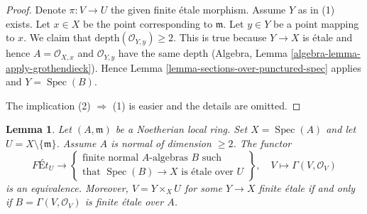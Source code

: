\documentclass{stacks-project}
\theoremstyle{plain}
\newtheorem{lemma}[subsection]{Lemma}
\theoremstyle{definition}
\theoremstyle{remark}
\numberwithin{equation}{subsection}
\def\Spec{\mathop{\mathrm{Spec}}}
\begin{document}
\begin{proof}
Denote $\pi : V \to U$ the given finite \'etale morphism.
Assume $Y$ as in (1) exists. Let $x \in X$ be the point
corresponding to $\mathfrak m$.
Let $y \in Y$ be a point mapping to $x$. We claim that
$\text{depth}(\mathcal{O}_{Y, y}) \geq 2$.
This is true because $Y \to X$ is \'etale and hence
$A = \mathcal{O}_{X, x}$ and $\mathcal{O}_{Y, y}$ have
the same depth (Algebra, Lemma \ref{algebra-lemma-apply-grothendieck}).
Hence Lemma \ref{lemma-sections-over-punctured-spec}
applies and $Y = \Spec(B)$.

\medskip\noindent
The implication (2) $\Rightarrow$ (1) is easier and the
details are omitted.
\end{proof}

\begin{lemma}
\label{lemma-reformulate-purity-normal}
Let $(A, \mathfrak m)$ be a Noetherian local ring. Set $X = \Spec(A)$
and let $U = X \setminus \{\mathfrak m\}$. Assume $A$ is normal
of dimension $\geq 2$. The functor
$$
\textit{F\'Et}_U \longrightarrow
\left\{
\begin{matrix}
\text{finite normal }A\text{-algebras }B\text{ such} \\
\text{that }\Spec(B) \to X\text{ is \'etale over }U
\end{matrix}
\right\},
\quad
V \longmapsto \Gamma(V, \mathcal{O}_V)
$$
is an equivalence. Moreover, $V = Y \times_X U$ for some $Y \to X$
finite \'etale if and only if $B = \Gamma(V, \mathcal{O}_V)$
is finite \'etale over $A$.
\end{lemma}
\end{document}
